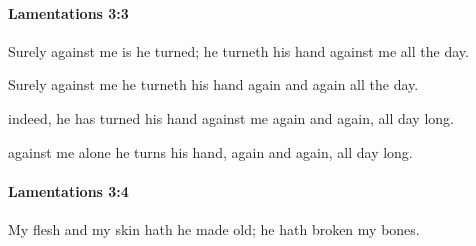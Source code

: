 		\paragraph{Lamentations 3:3} %
			\label{LAMENTATIONS-3-3}

			Surely against me is he turned; he turneth his hand against me all the day.

			\begin{versebox}
					\item[BHS] 
					\item[LXX] 
					\item[ASV] Surely against me he turneth his hand again and again all the day.
					\item[NIV] indeed, he has turned his hand against me again and again, all day long.
					\item[NRSV] against me alone he turns his hand, again and again, all day long.
			\end{versebox}

		\paragraph{Lamentations 3:4} %
			\label{LAMENTATIONS-3-4}

			My flesh and my skin hath he made old; he hath broken my bones.

